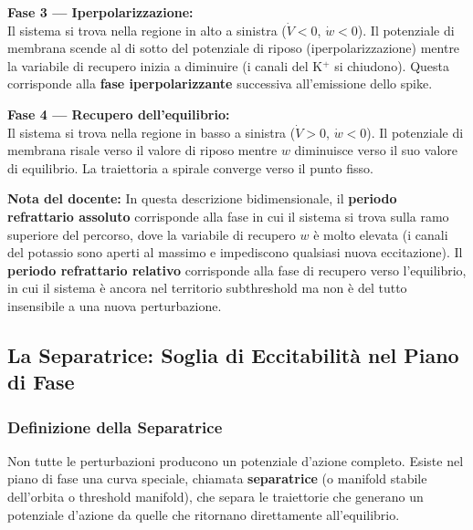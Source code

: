\textbf{Fase 3 — Iperpolarizzazione:}\\
Il sistema si trova nella regione in alto a sinistra ($\dot{V} < 0$, $\dot{w} < 0$). Il potenziale di membrana scende al di sotto del potenziale di riposo (iperpolarizzazione) mentre la variabile di recupero inizia a diminuire (i canali del K$^+$ si chiudono). Questa corrisponde alla \textbf{fase iperpolarizzante} successiva all'emissione dello spike.

\textbf{Fase 4 — Recupero dell'equilibrio:}\\
Il sistema si trova nella regione in basso a sinistra ($\dot{V} > 0$, $\dot{w} < 0$). Il potenziale di membrana risale verso il valore di riposo mentre $w$ diminuisce verso il suo valore di equilibrio. La traiettoria a spirale converge verso il punto fisso.

\begin{tcolorbox}[colback=gray!5, colframe=gray!40, arc=2mm, boxrule=0.5pt]
\textbf{Nota del docente:} In questa descrizione bidimensionale, il \textbf{periodo refrattario assoluto} corrisponde alla fase in cui il sistema si trova sulla ramo superiore del percorso, dove la variabile di recupero $w$ è molto elevata (i canali del potassio sono aperti al massimo e impediscono qualsiasi nuova eccitazione). Il \textbf{periodo refrattario relativo} corrisponde alla fase di recupero verso l'equilibrio, in cui il sistema è ancora nel territorio subthreshold ma non è del tutto insensibile a una nuova perturbazione.
\end{tcolorbox}



\subsection{La Separatrice: Soglia di Eccitabilità nel Piano di Fase}

\subsubsection{Definizione della Separatrice}

Non tutte le perturbazioni producono un potenziale d'azione completo. Esiste nel piano di fase una curva speciale, chiamata \textbf{separatrice} (o manifold stabile dell'orbita o threshold manifold), che separa le traiettorie che generano un potenziale d'azione da quelle che ritornano direttamente all'equilibrio.


